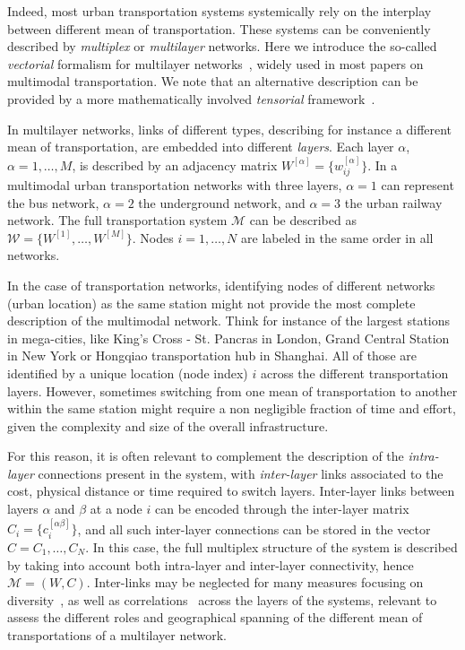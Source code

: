Indeed, most urban transportation systems systemically rely on the interplay between different mean of transportation. These systems can be conveniently described by \textit{multiplex} or \textit{multilayer} networks. Here we introduce the so-called \textit{vectorial} formalism for multilayer networks~\cite{boccaletti2014structure, battiston2014structural}, widely used in most papers on multimodal transportation. We note that an alternative description can be provided by a more mathematically involved \textit{tensorial} framework~\cite{dedomenico2013mathematical, kivela2014multilayer}.  

In multilayer networks, links of different types, describing for instance a different mean of transportation, are embedded into different \textit{layers}. Each layer $\alpha$, $\alpha = 1, \ldots, M$, is described by an adjacency matrix 
$ W^{[\alpha]} = \{w_{ij}^{[\alpha]}\}$. In a multimodal urban transportation networks with three layers, $\alpha=1$ can represent the bus network, $\alpha=2$ the underground network, and $\alpha=3$ the urban railway network. The full transportation system $\mathcal M$ can be described as $\mathcal W = \{W^{[1]}, \ldots,  W^{[M]}\}$. Nodes $i=1, \dots, N$ are labeled in the same order in all networks. 

In the case of transportation networks, identifying nodes of different networks (urban location) as the same station might not provide the most complete description of the multimodal network. Think for instance of the largest stations in mega-cities, like King's Cross - St. Pancras in London, Grand Central Station in New York or Hongqiao transportation hub in Shanghai. All of those are identified by a unique location (node index) $i$ across the different transportation layers. However, sometimes switching from one mean of transportation to another within the same station might require a non negligible fraction of time and effort, given the complexity and size of the overall infrastructure. 

For this reason, it is often relevant to complement the description of the \textit{intra-layer} connections present in the system, with \textit{inter-layer} links associated to the cost, physical distance or time required to switch layers. Inter-layer links between layers $\alpha$ and $\beta$ at a node $i$ can be encoded through the inter-layer matrix $C_i=\{c_i^{[\alpha \beta]} \}$, and all such inter-layer connections can be stored in the vector $ C = {C_1, \ldots, C_N}$. In this case, the full multiplex structure of the system is described by taking into account both intra-layer and inter-layer connectivity, hence $\mathcal M = ( W,  C)$. Inter-links may be neglected for many measures focusing on diversity~\cite{battiston2014structural}, as well as correlations~\cite{nicosia2015measuring} across the layers of the systems, relevant to assess the different roles and geographical spanning of the different mean of transportations of a multilayer network. 


